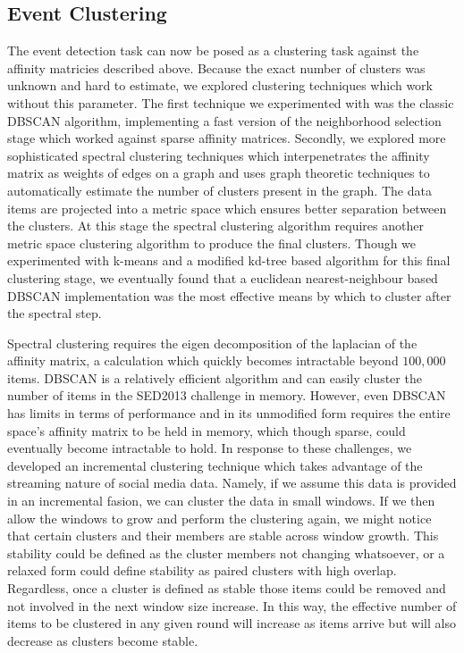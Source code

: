 \documentclass{../acm_proc_article-me11_tweaked}
\begin{document}

\subsection{Event Clustering} %
\label{sub:event_clustering}

The event detection task can now be posed as a clustering task against the affinity matricies described above. Because the exact number of clusters was unknown and hard to estimate, we explored clustering techniques which work without this parameter. The first technique we experimented with was the classic DBSCAN algorithm, implementing a fast version of the neighborhood selection stage which worked against sparse affinity matrices. Secondly, we explored more sophisticated spectral clustering techniques which interpenetrates the affinity matrix as weights of edges on a graph and uses graph theoretic techniques to automatically estimate the number of clusters present in the graph. The data items are projected into a metric space which ensures better separation between the clusters. At this stage the spectral clustering algorithm requires another metric space clustering algorithm to produce the final clusters. Though we experimented with k-means and a modified kd-tree based algorithm for this final clustering stage, we eventually found that a euclidean nearest-neighbour based DBSCAN implementation was the most effective means by which to cluster after the spectral step.  

Spectral clustering requires the eigen decomposition of the laplacian of the affinity matrix, a calculation which quickly becomes intractable beyond $100,000$ items. DBSCAN is a relatively efficient algorithm and can easily cluster the number of items in the SED2013 challenge in memory. However, even DBSCAN has limits in terms of performance and in its unmodified form requires the entire space's affinity matrix to be held in memory, which though sparse, could eventually become intractable to hold. In response to these challenges, we developed an incremental clustering technique which takes advantage of the streaming nature of social media data. Namely, if we assume this data is provided in an incremental fasion, we can cluster the data in small windows. If we then allow the windows to grow and perform the clustering again, we might notice that certain clusters and their members are stable across window growth. This stability could be defined as the cluster members not changing whatsoever, or a relaxed form could define stability as paired clusters with high overlap. Regardless, once a cluster is defined as stable those items could be removed and not involved in the next window size increase. In this way, the effective number of items to be clustered in any given round will increase as items arrive but will also decrease as clusters become stable.
\end{document}
